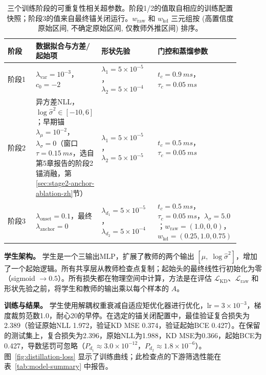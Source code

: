 \begin{table}[t]
\centering
\footnotesize
\setlength{\tabcolsep}{3pt}
\renewcommand{\arraystretch}{1.18}
\begin{tabular}{@{}L{0.12\linewidth}L{0.24\linewidth}L{0.24\linewidth}L{0.30\linewidth}@{}}
\toprule
阶段 & 数据拟合与方差/起始项 & 形状先验 & 门控和蒸馏参数 \\
\midrule
阶段1 &
\(\lambda_{\mathrm{var}}=10^{-3}\)，\(c_0=-2\) &
\(\lambda_1=5\times10^{-5}\)，\(\lambda_2=5\times10^{-4}\) &
\(t_c=\SI{0.9}{ms}\)，\(\tau_c=\SI{0.05}{ms}\) \\
阶段2 &
异方差NLL，\(\log\hat{\sigma}^2\in[-10,6]\)；早期锚 \(\lambda_\mu=10^{-2}\)，\(\lambda_\sigma=0\)（窗口 \(\tau=\SI{0.15}{ms}\)，选自第5章报告的阶段2锚消融，第\ref{sec:stage2-anchor-ablation-zh}节） &
\(\lambda_1=5\times10^{-5}\)，\(\lambda_2=5\times10^{-5}\) &
\(t_c=\SI{0.5}{ms}\)，\(\tau_c=\SI{0.05}{ms}\) \\
阶段3 &
\(\lambda_{\mathrm{onset}}=0.1\)，最终 \(\lambda_{\mathrm{anchor}}=0\) &
\(\lambda_{d_1}=5\times10^{-5}\)，\(\lambda_{d_2}=5\times10^{-4}\) &
\(t_c=\SI{0.5}{ms}\)，\(\tau_c=\SI{0.05}{ms}\)，\(\lambda_\sigma=5.0\)；\(w_{\mathrm{raw}}=(1.0,0,0)\)，\(w_{\mathrm{kd}}=(0.25,1.0,0.75)\) \\
\bottomrule
\end{tabular}
\caption{三个训练阶段的可重复性相关超参数。阶段1/2的值取自相应的训练配置快照；阶段3的值来自最终锚关闭运行。\(w_{\mathrm{raw}}\) 和 \(w_{\mathrm{kd}}\) 三元组按 (高置信度原始区间, 不确定原始区间, 仅教师外推区间) 排序。}
\label{tab:training-hyperparameters}
\end{table}

\textbf{学生架构。} 学生是一个三输出MLP，扩展了教师的两个输出 $[\hat\mu,\;\log\hat\sigma^2]$，增加了一个起始逻辑。所有共享层从教师检查点复制；起始头的最终线性行初始化为零（sigmoid $\to0.5$）。所有损失都在物理空间中计算，方法是在评估 $\mathcal{L}_{\mathrm{KD}}$、$\mathcal{L}_{\mathrm{raw}}$ 和形状先验之前，将学生和教师的输出乘以每个样本的 $A$。

\textbf{训练与结果。} 学生使用解耦权重衰减自适应矩优化器进行优化，$\mathrm{lr}=3\times10^{-3}$，梯度裁剪范数1.0，耐心20的早停。在选定的锚关闭配置中，最佳验证复合损失为2.389（验证原始NLL 1.972，验证KD MSE 0.374，验证起始BCE 0.427）。在保留的测试集上，复合损失为2.396，原始NLL为1.988，KD MSE为0.366，起始BCE为0.427，导数惩罚可忽略（$P_{d_1}\approx3.0\times10^{-12}$，$P_{d_2}\approx1.8\times10^{-6}$）。图~\ref{fig:distillation-loss} 显示了训练曲线；此检查点的下游筛选性能在表~\ref{tab:model-summary} 中报告。

